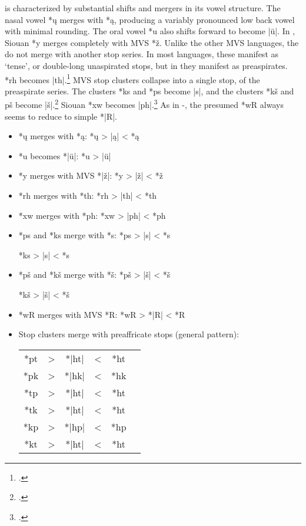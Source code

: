 \documentclass[output=paper]{LSP/langsci}
\begin{document}
 is characterized by substantial shifts and mergers in its vowel structure.  The nasal  vowel *\k{u} merges with *\k{a}, producing a variably pronounced low back vowel with minimal rounding.  The oral vowel *u also shifts forward to become |\"u|.  In , Siouan *y merges completely with MVS *\v{z}.  Unlike the other MVS languages, the  do not merge with another stop series.  In most  languages, these manifest as `tense', or double-long unaspirated stops, but in  they manifest as preaspirates.   *rh becomes |th|.\footnote{\citealt[165]{Rankinetal2006PDF}.} MVS stop clusters collapse into a single stop, of the preaspirate series.  The clusters *ks and *ps become |s|, and the clusters *kš and pš become |š|.\footnote{\citealt[64, 123, 222, 849]{Rankinetal2006PDF}.} Siouan *xw becomes |ph|.\footnote{\citealt[180]{Rankinetal2006PDF}.} As in -, the presumed  *wR always seems to reduce to simple *|R|.

\begin{itemize}
\item *\k{u} merges with *\k{a}: \hspace{3.1em} *\k{u}	>	|\k{a}|	<	*\k{a}
\item *u becomes *|\"u|:	 \hspace{4.1em} *u	>	|\"u|
\item *y merges with MVS *|\v{z}|: \hspace{1em} *y	>	|\v{z}|	<	*\v{z}
\item *rh merges with *th: \hspace{3em} *rh	>	|th|	<	*th
\item *xw merges with *ph:	\hspace{ 3em} *xw	>	|ph|	<	*ph
\item *ps and *ks merge with *s: \hspace{1em} *ps	>	|s|	<	*s

\hspace{12em} *ks	>	|s|	<	*s
\item *pš and *kš merge with *š: \hspace{1em} *pš	>	|š|	<	*š

\hspace{12em} *kš	>	|š|	<	*š
\item *wR merges with MVS *R: \hspace{1em} *wR	>	*|R|	<	*R
\item Stop clusters merge with preaffricate stops (general pattern):	


\begin{tabular}[t]{c c c c c c }
*pt & > & *|ht| & < & *ht \\
*pk	& > & *|hk| & < & *hk \\
*tp & > & *|ht| & < & *ht \\
*tk & > & *|ht| & < & *ht \\
*kp	& >	 & *|hp|	& <	& *hp \\
*kt	& >	& *|ht| & < & *ht \\
\end{tabular}
\end{itemize} 
 
\end{document}

